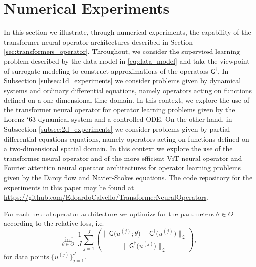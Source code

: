 \documentclass[twoside]{article}
\newcommand{\1}{\mathbbm{1}}
\newcommand{\cZ}{\mathcal{Z}}
\newcommand{\sG}{\mathsf{G}}
\begin{document}


\section{Numerical Experiments}
\label{sec:numerics}

In this section we illustrate, through numerical experiments, the capability of the transformer neural operator architectures described in Section \ref{sec:transformers_operator}. Throughout, we consider the supervised learning problem described by the data model in \eqref{eq:data_model} and take the viewpoint of surrogate modeling to construct approximations of the operators $\sG^\dagger$. In Subsection \ref{subsec:1d_experiments} we consider problems given by dynamical systems and ordinary differential equations, namely operators acting on functions defined on a one-dimensional time domain. In this context, we explore the use of the transformer neural operator for operator learning problems given by the Lorenz `63 dynamical system and a controlled ODE. On the other hand, in Subsection \ref{subsec:2d_experiments} we consider problems given by partial differential equations equations, namely operators acting on functions defined on a two-dimensional spatial domain. In this context we explore the use of the transformer neural operator and of the more efficient ViT neural operator and Fourier attention neural operator architectures for operator learning problems given by the Darcy flow and Navier-Stokes equations. The code repository for the experiments in this paper may be found at \href{https://github.com/EdoardoCalvello/TransformerNeuralOperators}{https://github.com/EdoardoCalvello/TransformerNeuralOperators}.

\begin{remark}
For each neural operator architecture we optimize for the parameters $\theta \in\Theta$ according to the relative loss, i.e.
\begin{equation}
    \inf_{\theta\in\Theta}\, \frac1J\sum_{j=1}^J
\left(\frac{\|\sG\bigl(u^{(j)};\theta\bigr)-\sG^\dagger\bigl(u^{(j)}\bigr)\|_{\cZ}}{\|\sG^\dagger\bigl(u^{(j)}\bigr)\|_{\cZ}} \right),
\end{equation} 
for data points $\{u^{(j)}\}_{j=1}^J$.
\end{remark}
\end{document}
